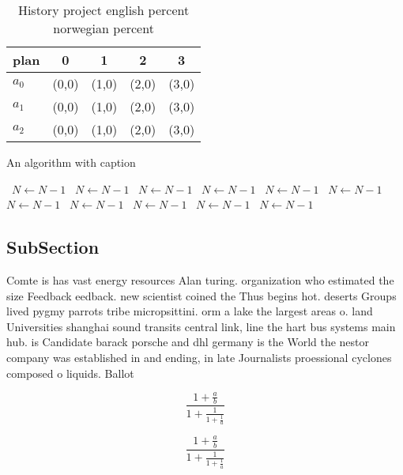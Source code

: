 \documentclass[a4paper]{article}
\begin{document}
\begin{table}
\begin{adjustbox}{width=0.6\columnwidth}
\begin{tabular}{|l|l|l|l|l|}
\hline
\textbf{plan} & \multicolumn{1}{c|}{\textbf{0}} & \multicolumn{1}{c|}{\textbf{1}} & \multicolumn{1}{c|}{\textbf{2}} & \multicolumn{1}{c|}{\textbf{3}} \\ \hline
\textbf{$a_0$}  & (0,0) & (1,0) & (2,0) & (3,0) \\ \hline
\textbf{$a_1$}  & (0,0) & (1,0) & (2,0) & (3,0) \\ \hline
\textbf{$a_2$}  & (0,0) & (1,0) & (2,0) & (3,0) \\ \hline
\end{tabular}
\end{adjustbox}
\caption{History project english percent norwegian percent
}
\end{table}

\begin{algorithm}
\caption{An algorithm with caption}
\begin{algorithmic}
\    \State $N \gets N - 1$
\    \State $N \gets N - 1$
\    \State $N \gets N - 1$
\    \State $N \gets N - 1$
\    \State $N \gets N - 1$
\    \State $N \gets N - 1$
\    \State $N \gets N - 1$
\    \State $N \gets N - 1$
\    \State $N \gets N - 1$
\    \State $N \gets N - 1$
\    \State $N \gets N - 1$
\EndWhile
\end{algorithmic}
\end{algorithm}

\subsection{SubSection}

Comte is has vast energy resources Alan turing. organization who estimated the size Feedback eedback. new scientist coined the Thus begins hot. deserts Groups lived pygmy parrots tribe micropsittini. orm a lake the largest areas o. land Universities shanghai sound transits central link, line the hart bus systems main hub. is Candidate barack porsche and dhl germany is the World the nestor company was established in and ending, in late Journalists proessional cyclones composed o liquids. Ballot 

\[ \frac{1+\frac{a}{b}}{1+\frac{1}{1+\frac{1}{a}}} \]

\[ \frac{1+\frac{a}{b}}{1+\frac{1}{1+\frac{1}{a}}} \]
\end{document}
